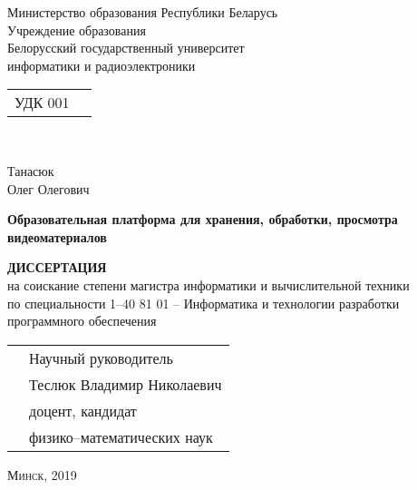 \begin{titlepage}
  \begin{center}
    Министерство образования Республики Беларусь\\
    Учреждение образования\\
    Белорусский государственный университет\\
    информатики и радиоэлектроники\\

    \bigskip\bigskip\bigskip

    \begin{minipage}{\textwidth}
      \begin{flushleft}
        \begin{tabular}{ l l }
          УДК 001
        \end{tabular}
      \end{flushleft}
    \end{minipage}\\[0.5cm]

    \bigskip\bigskip\bigskip

    Танасюк\\
    Олег Олегович\\

    \bigskip\bigskip

    \textbf{Образовательная платформа для хранения, обработки, просмотра видеоматериалов}\\

    \bigskip\bigskip

    \textbf{ДИССЕРТАЦИЯ}\\
    на соискание степени магистра информатики и вычислительной техники\\
    по специальности 1–40 81 01 –  Информатика и технологии разработки\\
    программного обеспечения

    \bigskip\bigskip\bigskip\bigskip\bigskip\bigskip\bigskip

    \begin{tabular}{ l l }
      \hspace*{8cm} & Научный руководитель\\
      & Теслюк Владимир Николаевич\\
      & доцент, кандидат \\
      & физико–математических наук
    \end{tabular}
    \vfill

    \textsc{Минск, 2019}
  \end{center}
\end{titlepage}
